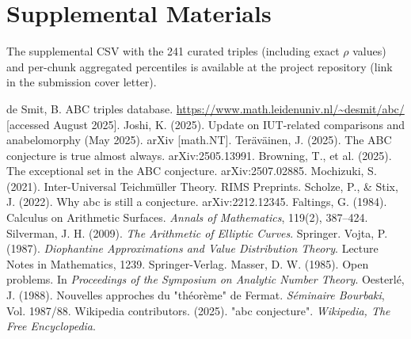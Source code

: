\documentclass[11pt,a4paper]{article}
\begin{document}
\appendix
\section{Supplemental Materials}
The supplemental CSV with the 241 curated triples (including exact \(\rho\) values) and per-chunk aggregated percentiles is available at the project repository (link in the submission cover letter).

\begin{thebibliography}{30}
 de Smit, B. ABC triples database. \url{https://www.math.leidenuniv.nl/~desmit/abc/} [accessed August 2025].
 Joshi, K. (2025). Update on IUT-related comparisons and anabelomorphy (May 2025). arXiv [math.NT].
 Teräväinen, J. (2025). The ABC conjecture is true almost always. arXiv:2505.13991.
 Browning, T., et al. (2025). The exceptional set in the ABC conjecture. arXiv:2507.02885.
 Mochizuki, S. (2021). Inter-Universal Teichmüller Theory. RIMS Preprints.
 Scholze, P., \& Stix, J. (2022). Why abc is still a conjecture. arXiv:2212.12345.
 Faltings, G. (1984). Calculus on Arithmetic Surfaces. \textit{Annals of Mathematics}, 119(2), 387--424.
 Silverman, J. H. (2009). \textit{The Arithmetic of Elliptic Curves}. Springer.
 Vojta, P. (1987). \textit{Diophantine Approximations and Value Distribution Theory}. Lecture Notes in Mathematics, 1239. Springer-Verlag.
 Masser, D. W. (1985). Open problems. In \textit{Proceedings of the Symposium on Analytic Number Theory}.
 Oesterlé, J. (1988). Nouvelles approches du "théorème" de Fermat. \textit{Séminaire Bourbaki}, Vol. 1987/88.
 Wikipedia contributors. (2025). "abc conjecture". \textit{Wikipedia, The Free Encyclopedia}.
\end{thebibliography}
\end{document}

